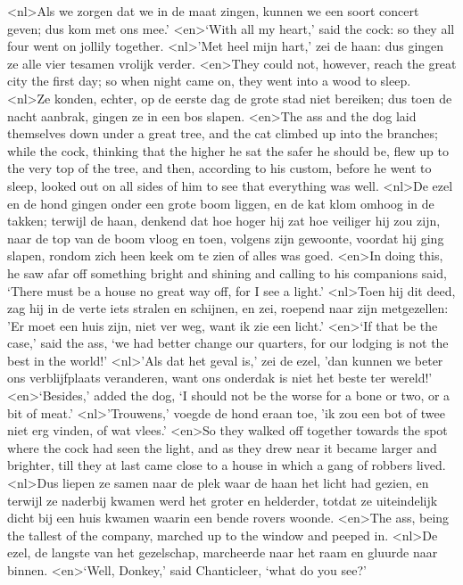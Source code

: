 <nl>Als we zorgen dat we in de maat zingen, kunnen we een soort concert geven; dus kom met ons mee.'
<en>‘With all my heart,’ said the cock: so they all four went on jollily together.
<nl>'Met heel mijn hart,' zei de haan: dus gingen ze alle vier tesamen vrolijk verder.
<en>They could not, however, reach the great city the first day; so when night came on, they went into a wood to sleep.
<nl>Ze konden, echter, op de eerste dag de grote stad niet bereiken; dus toen de nacht aanbrak, gingen ze in een bos slapen.
<en>The ass and the dog laid themselves down under a great tree, and the cat climbed up into the branches; while the cock, thinking that the higher he sat the safer he should be, flew up to the very top of the tree, and then, according to his custom, before he went to sleep, looked out on all sides of him to see that everything was well.
<nl>De ezel en de hond gingen onder een grote boom  liggen, en de kat klom omhoog in de takken; terwijl de haan, denkend dat hoe hoger hij zat hoe veiliger hij zou zijn, naar de top van de boom vloog en toen, volgens zijn gewoonte, voordat hij ging slapen, rondom zich heen keek om te zien of alles was goed.
<en>In doing this, he saw afar off something bright and shining and calling to his companions said, ‘There must be a house no great way off, for I see a light.’
<nl>Toen hij dit deed, zag hij in de verte iets stralen en schijnen, en zei, roepend naar zijn metgezellen: 'Er moet een huis zijn, niet ver weg, want ik zie een licht.'
<en>‘If that be the case,’ said the ass, ‘we had better change our quarters, for our lodging is not the best in the world!’
<nl>'Als dat het geval is,' zei de ezel, 'dan kunnen we beter ons verblijfplaats veranderen, want ons onderdak is niet het beste ter wereld!'
<en>‘Besides,’ added the dog, ‘I should not be the worse for a bone or two, or a bit of meat.’
<nl>'Trouwens,' voegde de hond eraan toe, 'ik zou  een bot of twee niet erg vinden, of wat vlees.'
<en>So they walked off together towards the spot where the cock had seen the light, and as they drew near it became larger and brighter, till they at last came close to a house in which a gang of robbers lived.
<nl>Dus liepen ze samen naar de plek waar de haan het licht had gezien, en terwijl ze naderbij kwamen werd het groter en helderder, totdat ze uiteindelijk dicht bij een huis kwamen waarin een bende rovers woonde.
<en>The ass, being the tallest of the company, marched up to the window and peeped in.
<nl>De ezel, de langste van het gezelschap, marcheerde naar het raam en gluurde naar binnen.
<en>‘Well, Donkey,’ said Chanticleer, ‘what do you see?’
